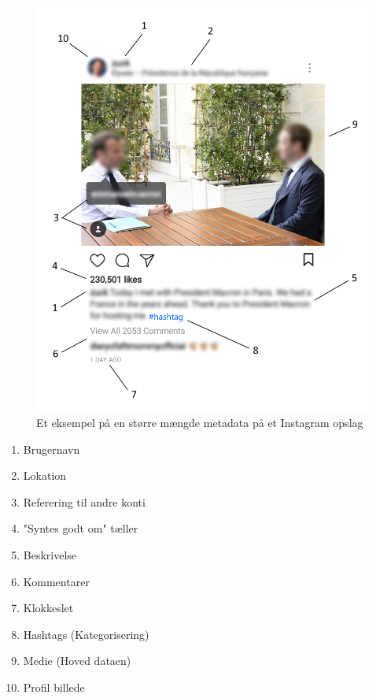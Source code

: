 \begin{table}[H]
    \begin{minipage}{.65\textwidth}
        \begin{figure}[H]
            \centering
            \includegraphics[width=1.0\linewidth ]{Projectdoc/Assets/Illustrationer/IG-meta.png} 
            \caption{Et eksempel på en større mængde metadata på et Instagram opslag}
            \label{fig:ig_metadata}
        \end{figure}
    \end{minipage}
    \begin{minipage}{.35\textwidth}
        \begin{enumerate}
            \item Brugernavn
            \item Lokation
            \item Referering til andre konti
            \item "Syntes godt om" tæller
            \item Beskrivelse
            \item Kommentarer
            \item Klokkeslet
            \item Hashtags (Kategorisering)
            \item Medie (Hoved dataen)
            \item Profil billede
        \end{enumerate}
    \end{minipage}
\end{table}

